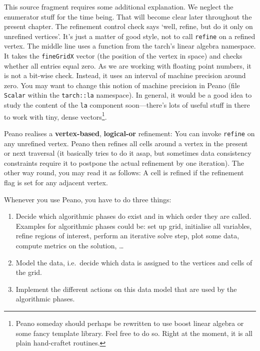\noindent
This source fragment requires some additional explanation. 
We neglect the enumerator stuff for the time being.
That will become clear later throughout the present chapter.
The refinement control check says `well, refine, but do it only on unrefined
vertices'.
It's just a matter of good style, not to call \texttt{refine} on a refined
vertex.
The middle line uses a function from the tarch's linear algebra namespace. 
It takes the \texttt{fineGridX} vector (the position of the vertex in space) and
checks whether all entries equal zero.
As we are working with floating point numbers, it is not a bit-wise check. 
Instead, it uses an interval of machine precision around zero.
You may want to change this notion of machine precision in Peano (file
\texttt{Scalar} within the \texttt{tarch::la} namespace). 
In general, it would be a good idea to study the content of the \texttt{la}
component soon---there's lots of useful stuff in there to work with
tiny, dense vectors\footnote{Peano someday should perhaps be rewritten to use
boost linear algebra or some fancy template library. Feel free to do so. Right
at the moment, it is all plain hand-craftet routines.}.

\begin{remark}
  Peano realises a {\bf vertex-based}, {\bf logical-or} refinement: You can
  invoke \texttt{refine} on any unrefined vertex. Peano then refines all cells
  around a vertex in the present or next traversal (it basically tries to do it
  asap, but sometimes data consistency constraints require it to postpone the
  actual refinement by one iteration). The other way round, you may read it as
  follows: A cell is refined if the refinement flag is set for any adjacent
  vertex.
\end{remark}


Whenever you use Peano, you have to do three things:
\begin{enumerate}
  \item Decide which algorithmic phases do exist and in which order they are
  called. Examples for algorithmic phases could be: set up grid, initialise all
  variables, refine regions of interest, perform an iterative solve step, plot
  some data, compute metrics on the solution, \ldots
  \item Model the data, i.e.~decide which data is assigned to the vertices and
  cells of the grid.
  \item Implement the different actions on this data model that are used by the
  algorithmic phases.
\end{enumerate}


